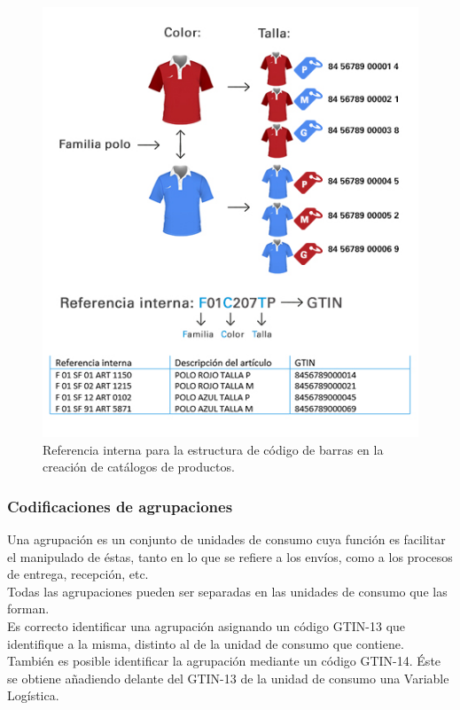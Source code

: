 \begin{figure}
  \centering
    \includegraphics[scale=0.7]{./Capitulo2/figs/catalogo_post_barras.jpg}
  \caption{Referencia interna para la estructura de código de barras en la creación de catálogos de productos.}
  \label{catalogo_post_barras}
\end{figure}

\subsubsection{Codificaciones de agrupaciones}

Una agrupación es un conjunto de unidades de consumo cuya función es facilitar el manipulado de éstas, tanto en lo que se refiere a los envíos, como a los procesos de entrega, recepción, etc.\\

Todas las agrupaciones pueden ser separadas en las unidades de consumo que las forman.\\

Es correcto identificar una agrupación asignando un código GTIN-13 que identifique a la misma, distinto al de la unidad de consumo que contiene.\\

También es posible identificar la agrupación mediante un código GTIN-14. Éste se obtiene añadiendo delante del GTIN-13 de la unidad de consumo una Variable Logística.\

